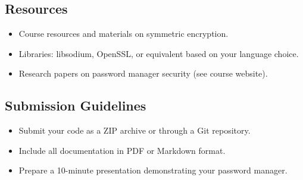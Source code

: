 \documentclass[10pt,a4paper,american]{exam}
\begin{document}
\subsection*{Resources}
\begin{itemize}
	\item Course resources and materials on symmetric encryption.
	\item Libraries: libsodium, OpenSSL, or equivalent based on your language choice.
	\item Research papers on password manager security (see course website).
\end{itemize}

\subsection*{Submission Guidelines}
\begin{itemize}
	\item Submit your code as a ZIP archive or through a Git repository.
	\item Include all documentation in PDF or Markdown format.
	\item Prepare a 10-minute presentation demonstrating your password manager.
\end{itemize}
\end{document}
